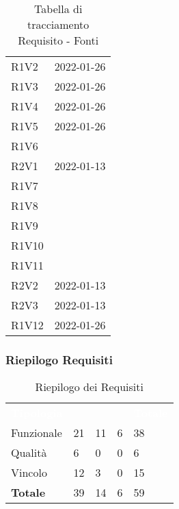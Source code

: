 \begin{table}[!htbp]
\begin{tabular}{ m{}<{\centering}  m{}<{\centering} }
	R1V2 & \Ve{} 2022-01-26 \\	
	 
	R1V3 & \Ve{} 2022-01-26 \\	

	R1V4 & \Ve{} 2022-01-26 \\	
	 
	R1V5 & \Ve{} 2022-01-26 \\	
	 
	R1V6 & \Ca \\	
	 
	R2V1 & \Vi{} 2022-01-13 \\
	
	R1V7 & \Ca \\	
	 
	R1V8 & \Ca \\	 
	
	R1V9 & \Ca \\	
	
	R1V10 & \Ca \\
	
	R1V11 & \Ca \\

	R2V2 & \Vi{} 2022-01-13 \\	
	 
	R2V3 & \Vi{} 2022-01-13 \\	
	 
	R1V12 & \Ve{} 2022-01-26 \\	

\end{tabular}
\caption{Tabella di tracciamento Requisito - Fonti}
\end{table}

\subsubsection{Riepilogo Requisiti}

\begin{table}[!htbp]
\renewcommand{\arraystretch}{1.5}
\begin{tabular}{ m{}<{\centering}  m{}<{\centering}  m{}<{\centering}  m{}<{\centering}  m{}<{\centering} }
	\rowcolor{darkblue}
	\textcolor{white}{\textbf{Tipologia}} &\textcolor{white}{\textbf{\Ob}}& \textcolor{white}{\textbf{\De}} & \textcolor{white}{\textbf{\Fa}}&\textcolor{white}{\textbf{Totale}}\\ 
	Funzionale & 21 & 11 & 6 & 38\\	
	Qualità & 6 & 0 & 0 & 6 \\	
	Vincolo & 12 & 3 & 0 & 15 \\	
	\textbf{Totale} & 39 & 	14 & 6 & 59
\end{tabular}
\caption{Riepilogo dei Requisiti}
\end{table}